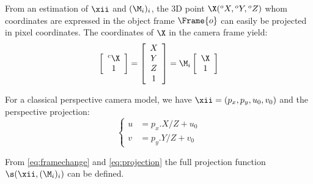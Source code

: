 \documentclass{ecnreport}
\begin{document}
From an estimation of $\xii$ and $(\M_i)_i$, the 3D point $\X({}^o X,{}^o Y,{}^o Z)$ whom coordinates are expressed in the object frame $\Frame{o}$ can easily be projected in pixel coordinates.
The coordinates of $\X$ in the camera frame yield:
\begin{equation}\label{eq:framechange}
 \left[\begin{array}{c}{}^c\X\\1\end{array}\right]=   \left[\begin{array}{c}X\\Y\\Z\\1\end{array}\right] =\M_i\left[\begin{array}{c}\X\\1\end{array}\right]
\end{equation}

For a classical perspective camera model, we have $\xii = (p_x, p_y, u_0, v_0)$ and the perspective projection:
\begin{equation}\label{eq:projection}
 \left\{\begin{array}{ll}
  u &= p_x.X/Z + u_0 \\
  v &= p_y.Y/Z + v_0
 \end{array}\right.
\end{equation}

From \eqref{eq:framechange} and \eqref{eq:projection} the full projection function $\s(\xii, (\M_i)_i)$ can be defined.\\ 
\end{document}
